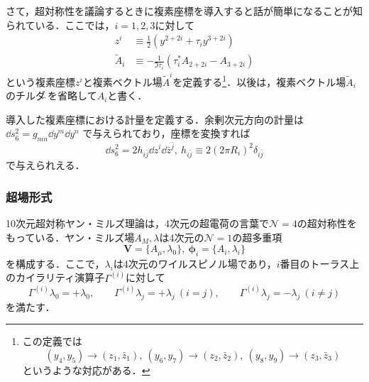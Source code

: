 \documentclass[a4paper,uplatex,dvipdfmx,10pt]{jsarticle}
\theoremstyle{definition}
\begin{document}
さて，超対称性を議論するときに複素座標を導入すると話が簡単になることが知られている．ここでは，$i=1,2,3$に対して
\begin{align}
   z^{i}
   &\equiv
   \frac{1}{2}(y^{2+2i}+\tau_{i}y^{3+2i})
   \nonumber
   \\
   \tilde{A}_{i}
   &\equiv
   -
   \frac{1}{\Im\tau_{i}}(\tau_{i}^{*}A_{2+2i}-A_{3+2i})
   \nonumber
\end{align}
という複素座標$z^{i}$と複素ベクトル場$\tilde{A}^{i}$を定義する\footnote{
   この定義では
   $$
      (y_{4},y_{5})
      \rightarrow
      (z_{1},\bar{z}_{1})
      ,\ 
      (y_{6},y_{7})
      \rightarrow
      (z_{2},\bar{z}_{2})
      ,\ 
      (y_{8},y_{9})
      \rightarrow
      (z_{3},\bar{z}_{3})
   $$
   というような対応がある．
}．以後は，複素ベクトル場$\tilde{A}_{i}$のチルダ$\tilde{\ }$を省略して$A_{i}$と書く．

導入した複素座標における計量を定義する．余剰次元方向の計量は
$
   \dd s_{6}^{2}
   =
   g_{mn}\dd y^{m}\dd y^{n}
$
で与えられており，座標を変換すれば
\begin{equation}
   \dd s_{6}^{2}
   =
   2h_{i\bar{j}}
   \dd z^{i}\dd \bar{z}^{\bar{j}}
   ,\ 
   h_{i\bar{j}}
   \equiv
   2(2\pi R_{i})^2\delta_{i\bar{j}}
   \nonumber
\end{equation}
で与えられえる．


\subsubsection{超場形式}

10次元超対称ヤン・ミルズ理論は，4次元の超電荷の言葉で$\mathcal{N}=4$の超対称性をもっている．ヤン・ミルズ場$A_{M},\lambda$は4次元の$\mathcal{N}=1$の超多重項
\begin{equation}
   \bm{V}
   =
   \{A_{\mu},\lambda_{0}\}
   ,\ 
   \bm{\phi}_{i}
   =
   \{A_{i},\lambda_{i}\}
   \nonumber
\end{equation}
を構成する．ここで，$\lambda_{i}$は4次元のワイルスピノル場であり，$i$番目のトーラス上のカイラリティ演算子$\Gamma^{(i)}$に対して
\begin{equation}
   \Gamma^{(i)}
   \lambda_{0}
   =
   +\lambda_{0}
   ,\qquad
   \Gamma^{(i)}
   \lambda_{j}
   =
   +\lambda_{j}
   \ 
   (i=j)
   ,\qquad
   \Gamma^{(i)}
   \lambda_{j}
   =
   -\lambda_{j}
   \ 
   (i\neq j)
   \nonumber
\end{equation}
を満たす．
\end{document}
